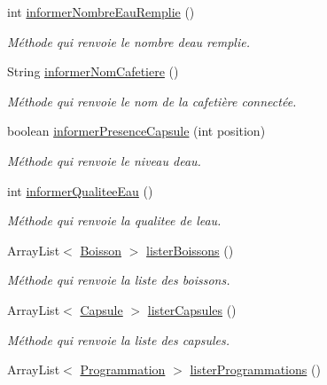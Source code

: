 \begin{DoxyCompactItemize}
int \hyperlink{classcom_1_1example_1_1ekawa_1_1_cafetiere_a456c870bf52bcd639abdc299e50ddd73}{informer\+Nombre\+Eau\+Remplie} ()
\begin{DoxyCompactList}\small\item\em Méthode qui renvoie le nombre d\textquotesingle{}eau remplie. \end{DoxyCompactList}\item 
String \hyperlink{classcom_1_1example_1_1ekawa_1_1_cafetiere_aa267545b22527a434e812f8c001d1e8a}{informer\+Nom\+Cafetiere} ()
\begin{DoxyCompactList}\small\item\em Méthode qui renvoie le nom de la cafetière connectée. \end{DoxyCompactList}\item 
boolean \hyperlink{classcom_1_1example_1_1ekawa_1_1_cafetiere_a35a291f849346b374f63324bc3ecd70b}{informer\+Presence\+Capsule} (int position)
\begin{DoxyCompactList}\small\item\em Méthode qui renvoie le niveau d\textquotesingle{}eau. \end{DoxyCompactList}\item 
int \hyperlink{classcom_1_1example_1_1ekawa_1_1_cafetiere_a1c04bcbd87ed47f8abf08e36e0629e13}{informer\+Qualitee\+Eau} ()
\begin{DoxyCompactList}\small\item\em Méthode qui renvoie la qualitee de l\textquotesingle{}eau. \end{DoxyCompactList}\item 
Array\+List$<$ \hyperlink{classcom_1_1example_1_1ekawa_1_1_boisson}{Boisson} $>$ \hyperlink{classcom_1_1example_1_1ekawa_1_1_cafetiere_a508a256d85a4e78c2b5c1a45899fcd99}{lister\+Boissons} ()
\begin{DoxyCompactList}\small\item\em Méthode qui renvoie la liste des boissons. \end{DoxyCompactList}\item 
Array\+List$<$ \hyperlink{classcom_1_1example_1_1ekawa_1_1_capsule}{Capsule} $>$ \hyperlink{classcom_1_1example_1_1ekawa_1_1_cafetiere_a86149d999dc196c3d97c855be0073e99}{lister\+Capsules} ()
\begin{DoxyCompactList}\small\item\em Méthode qui renvoie la liste des capsules. \end{DoxyCompactList}\item 
Array\+List$<$ \hyperlink{classcom_1_1example_1_1ekawa_1_1_programmation}{Programmation} $>$ \hyperlink{classcom_1_1example_1_1ekawa_1_1_cafetiere_af82120eee3f2f7dbb28f74e663bfe15a}{lister\+Programmations} ()

\end{DoxyCompactItemize}
